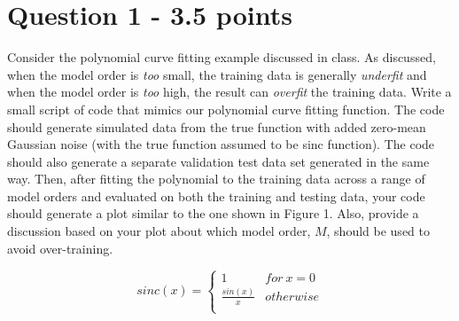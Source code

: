 \documentclass[11pt]{article}
\begin{document}
\section*{Question 1 - 3.5 points}
Consider the polynomial curve fitting example discussed in class. As discussed, when the model order is \emph{too} small, the training data is generally \emph{underfit} and when the model order is \emph{too} high, the result can \emph{overfit} the training data.  Write a small script of code that mimics our polynomial curve fitting function.  The code should generate simulated data from the true function with added zero-mean Gaussian noise (with the true function assumed to be sinc function). The code should also generate a separate validation test data set generated in the same way.  Then, after fitting the polynomial to the training data across a range of model orders and evaluated on both the training and testing data, your code should generate a plot similar to the one shown in Figure 1.  Also, provide a discussion based on your plot about which model order, $M$, should be used to avoid over-training.

\[  sinc(x) = \left\{
\begin{array}{ll}
      1 & for \: x=0 \\
      \frac{sin(x)}{x} & otherwise\\
\end{array} 
\right. \]
\end{document}
